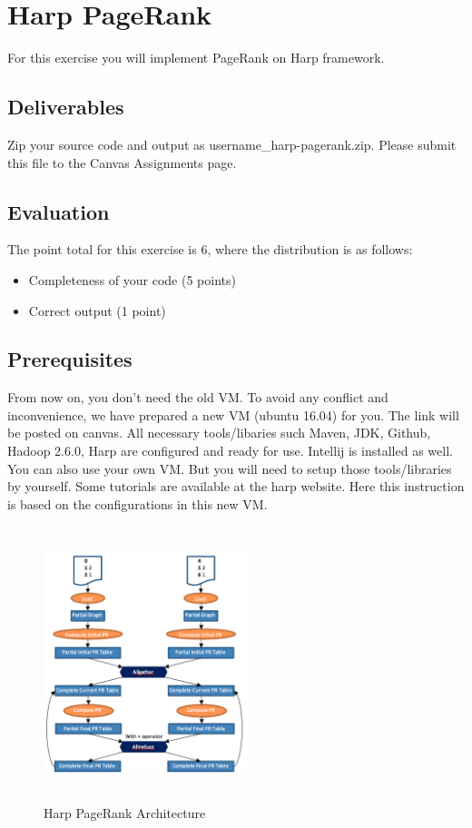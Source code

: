 \section*{Harp PageRank}

For this exercise you will implement PageRank on Harp framework.

\subsection*{Deliverables}
Zip your source code and output as username\_harp-pagerank.zip. Please submit
this file to the Canvas Assignments page.

\subsection*{Evaluation}
The point total for this exercise is 6, where the distribution is as follows:


\begin{itemize}
\item Completeness of your code (5 points)
\item Correct output (1 point)
\end{itemize}

\subsection*{Prerequisites}
From now on, you don't need the old VM. To avoid any conflict and
inconvenience, we have prepared a new VM (ubuntu 16.04) for you. The link will
be posted on canvas. All necessary tools/libaries such Maven, JDK, Github,
Hadoop 2.6.0, Harp are configured and ready for use. Intellij is installed as
well. You can also use your own VM. But you will need to setup those
tools/libraries by yourself. Some tutorials are available at the harp
website. Here this instruction is based on the configurations in
this new VM.

\begin{figure}[!htbp]
\includegraphics[width=6cm,height=8cm]{section/icloud/assignment/problems/project7/p8}
\centering
\caption{Harp PageRank Architecture}
\end{figure}

